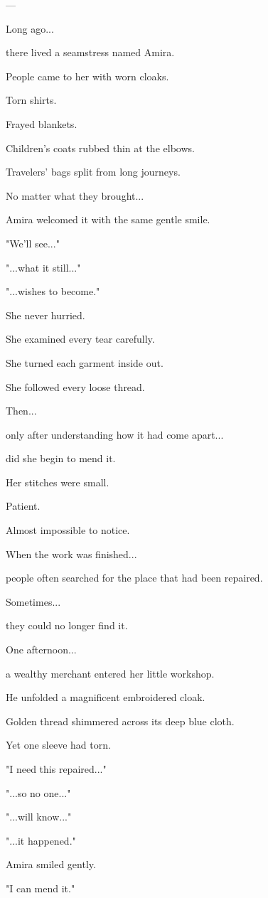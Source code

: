 \documentclass[12pt,openany]{book}
\begin{document}
---

Long ago...

there lived a seamstress named Amira.

People came to her with worn cloaks.

Torn shirts.

Frayed blankets.

Children's coats rubbed thin at the elbows.

Travelers' bags split from long journeys.

No matter what they brought...

Amira welcomed it with the same gentle smile.

"We'll see..."

"...what it still..."

"...wishes to become."

She never hurried.

She examined every tear carefully.

She turned each garment inside out.

She followed every loose thread.

Then...

only after understanding how it had come apart...

did she begin to mend it.

Her stitches were small.

Patient.

Almost impossible to notice.

When the work was finished...

people often searched for the place that had been repaired.

Sometimes...

they could no longer find it.

One afternoon...

a wealthy merchant entered her little workshop.

He unfolded a magnificent embroidered cloak.

Golden thread shimmered across its deep blue cloth.

Yet one sleeve had torn.

"I need this repaired..."

"...so no one..."

"...will know..."

"...it happened."

Amira smiled gently.

"I can mend it."
\end{document}
